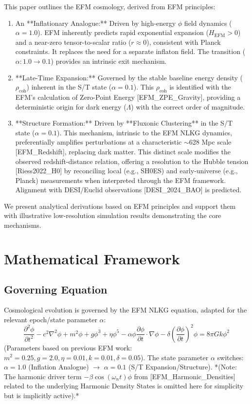 \documentclass[11pt]{article}
\begin{document}
This paper outlines the EFM cosmology, derived from EFM principles:
\begin{enumerate}
    \item An **Inflationary Analogue:** Driven by high-energy \(\phi\) field dynamics (\(\alpha=1.0\)). EFM inherently predicts rapid exponential expansion (\(H_{\text{EFM}} > 0\)) and a near-zero tensor-to-scalar ratio (\(r \approx 0\)), consistent with Planck constraints. It replaces the need for a separate inflaton field. The transition (\(\alpha: 1.0 \to 0.1\)) provides an intrinsic exit mechanism.
    \item **Late-Time Expansion:** Governed by the stable baseline energy density (\(\rho_{\text{coh}}\)) inherent in the S/T state (\(\alpha=0.1\)). This \(\rho_{\text{coh}}\) is identified with the EFM's calculation of Zero-Point Energy [EFM\_ZPE\_Gravity], providing a deterministic origin for dark energy (\(\Lambda\)) with the correct order of magnitude.
    \item **Structure Formation:** Driven by **Fluxonic Clustering** in the S/T state (\(\alpha=0.1\)). This mechanism, intrinsic to the EFM NLKG dynamics, preferentially amplifies perturbations at a characteristic \(\sim\)628 Mpc scale [EFM\_Redshift], replacing dark matter. This distinct scale modifies the observed redshift-distance relation, offering a resolution to the Hubble tension [Riess2022\_H0] by reconciling local (e.g., SH0ES) and early-universe (e.g., Planck) measurements when interpreted through the EFM framework. Alignment with DESI/Euclid observations [DESI\_2024\_BAO] is predicted.
\end{enumerate}
We present analytical derivations based on EFM principles and support them with illustrative low-resolution simulation results demonstrating the core mechanisms.

\section{Mathematical Framework}
\subsection{Governing Equation}
Cosmological evolution is governed by the EFM NLKG equation, adapted for the relevant epoch/state parameter \(\alpha\):
\begin{equation}
\frac{\partial^2 \phi}{\partial t^2} - c^2 \nabla^2 \phi + m^2 \phi + g \phi^3 + \eta \phi^5 - \alpha \phi \frac{\partial \phi}{\partial t} \cdot \nabla \phi - \delta \left(\frac{\partial \phi}{\partial t}\right)^2 \phi = 8\pi G k \phi^2 \label{eq:efm_cosmo_kge_main}
\end{equation}
(Parameters based on previous EFM work: \(m^2=0.25, g=2.0, \eta=0.01, k=0.01, \delta=0.05\)). The state parameter \(\alpha\) switches: \(\alpha=1.0\) (Inflation Analogue) \(\to\) \(\alpha=0.1\) (S/T Expansion/Structure). *(Note: The harmonic driver term \(-\beta \cos(\omega_n t)\phi\) from [EFM\_Harmonic\_Densities] related to the underlying Harmonic Density States is omitted here for simplicity but is implicitly active).*
\end{document}
